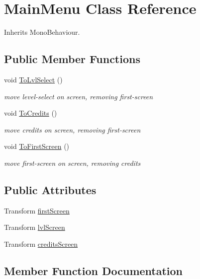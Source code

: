 \hypertarget{class_main_menu}{}\section{Main\+Menu Class Reference}
\label{class_main_menu}


Inherits Mono\+Behaviour.

\subsection*{Public Member Functions}
\begin{DoxyCompactItemize}
\item 
void \hyperlink{class_main_menu_aa2e38dd035811e5e486ad8f1c826555e}{To\+Lvl\+Select} ()
\begin{DoxyCompactList}\small\item\em move level-\/select on screen, removing first-\/screen \end{DoxyCompactList}\item 
void \hyperlink{class_main_menu_af83618ae5b4c4754b3c58db5ea6fbe7c}{To\+Credits} ()
\begin{DoxyCompactList}\small\item\em move credits on screen, removing first-\/screen \end{DoxyCompactList}\item 
void \hyperlink{class_main_menu_a5117a1e0327a098e4a17e29989fe25c7}{To\+First\+Screen} ()
\begin{DoxyCompactList}\small\item\em move first-\/screen on screen, removing credits \end{DoxyCompactList}\end{DoxyCompactItemize}
\subsection*{Public Attributes}
\begin{DoxyCompactItemize}
\item 
Transform \hyperlink{class_main_menu_af09082567bb61c7b9cffaca2034dc37b}{first\+Screen}
\item 
Transform \hyperlink{class_main_menu_a642b6ac70782065ff4dd315f1f811e36}{lvl\+Screen}
\item 
Transform \hyperlink{class_main_menu_ab647109a373252337dbfbda3a2f93b75}{credits\+Screen}
\end{DoxyCompactItemize}


\subsection{Member Function Documentation}
